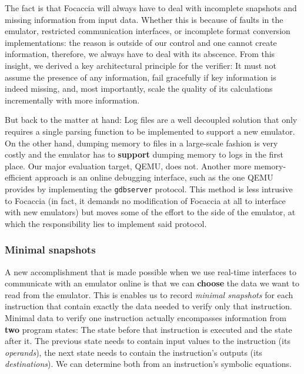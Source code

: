 The fact is that Focaccia will always have to deal with incomplete snapshots and missing information from input data.
Whether this is because of faults in the emulator, restricted communication interfaces, or incomplete format conversion
implementations: the reason is outside of our control and one cannot create information, therefore, we always have to
deal with its abscence. From this insight, we derived a key architectural principle for the verifier: It must not assume
the presence of any information, fail gracefully if key information is indeed missing, and, most importantly, scale the
quality of its calculations incrementally with more information.

But back to the matter at hand: Log files are a well decoupled solution that only requires a single parsing function to
be implemented to support a new emulator. On the other hand, dumping memory to files in a large-scale fashion is very
costly and the emulator has to \textbf{support} dumping memory to logs in the first place. Our major evaluation target,
QEMU, does not. Another more memory-efficient approach is an online debugging interface, such as the one QEMU provides
by implementing the \texttt{gdbserver} protocol. This method is less intrusive to Focaccia (in fact, it demands no
modification of Focaccia at all to interface with new emulators) but moves some of the effort to the side of the
emulator, at which the responsibility lies to implement said protocol.

\subsubsection{Minimal snapshots}

A new accomplishment that is made possible when we use real-time interfaces to communicate with an emulator online is
that we can \textbf{choose} the data we want to read from the emulator. This is enables us to record \textit{minimal
snapshots} for each instruction that contain exactly the data needed to verify only that instruction. Minimal data to
verify one instruction actually encompasses information from \textbf{two} program states: The state before that
instruction is executed and the state after it. The previous state needs to contain input values to the instruction (its
\textit{operands}), the next state needs to contain the instruction's outputs (its \textit{destinations}). We can
determine both from an instruction's symbolic equations.


